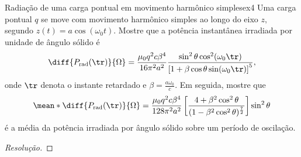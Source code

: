 \begin{exercício}{Radiação de uma carga pontual em movimento harmônico simples}{ex4}
    Uma carga pontual \(q\) se move com movimento harmônico simples ao longo do eixo \(z,\) segundo \(z(t) = a \cos(\omega_0 t).\) Mostre que a potência instantânea irradiada por unidade de ângulo sólido é
    \begin{equation*}
        \diff{P_\mathrm{rad}(\tr)}{\Omega} = \frac{\mu_0 q^2 c \beta^4}{16 \pi^2 a^2} \frac{\sin^2 \theta \cos^2(\omega_0 \tr)}{\left[1 + \beta \cos\theta \sin(\omega_0 \tr)\right]^5},
    \end{equation*}
    onde \(\tr\) denota o instante retardado e \(\beta = \frac{a \omega_0}{c}.\) Em seguida, mostre que 
    \begin{equation*}
        \mean*{\diff{P_\mathrm{rad}(\tr)}{\Omega}} = \frac{\mu_0 q^2 c \beta^4}{128 \pi^2 a^2} \left[\frac{4 + \beta^2 \cos^2\theta}{(1 - \beta^2 \cos^2 \theta)^{\frac72}}\right] \sin^2\theta
    \end{equation*}
    é a média da potência irradiada por ângulo sólido sobre um período de oscilação.
\end{exercício}
\begin{proof}[Resolução]
    
\end{proof}
